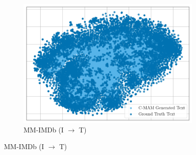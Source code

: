 \begin{figure}[!p]
\begin{subfigure}[b]{0.24\textwidth}
        \includegraphics[width=\textwidth]{imgs/tsne/mmimdb_text_cmam_1.png}
        \caption*{MM-IMDb (I $\rightarrow$ T)}
    \end{subfigure}

    \centering


\end{figure}
